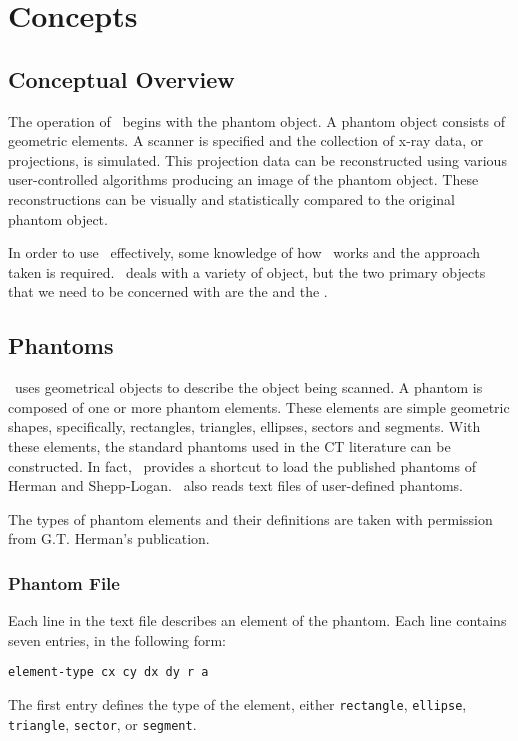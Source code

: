 \chapter{Concepts}
\ctsimfooter

\section{Conceptual Overview}
The operation of \ctsim\ begins with the phantom object.  A
phantom object consists of geometric elements.  A scanner is
specified and the collection of x-ray data, or projections, is
simulated. This projection data can be reconstructed using various
user-controlled algorithms producing an image of the phantom
object. These reconstructions can be visually and statistically
compared to the original phantom object.

In order to use \ctsim\ effectively, some knowledge of how
\ctsim\ works and the approach taken is required. \ctsim\ deals with a
variety of object, but the two primary objects that we need to be
concerned with are the  and the
.

\section{Phantoms}\label{conceptphantom}

\ctsim\ uses geometrical objects to describe the object being
scanned. A phantom is composed of one or more phantom elements.
These elements are simple geometric shapes, specifically,
rectangles, triangles, ellipses, sectors and segments. With these
elements, the standard phantoms used in the CT literature can be
constructed.  In fact, \ctsim\ provides a shortcut to load the
published phantoms of Herman\cite{HERMAN80} and
Shepp-Logan\cite{SHEPP74}. \ctsim\ also reads text files of
user-defined phantoms.

The types of phantom elements and their definitions are taken with
permission from G.T. Herman's publication\cite{HERMAN80}.

\subsection{Phantom File}\label{phantomfile}
Each line in the text file describes an element of the
phantom.  Each line contains seven entries, in the following form:
\begin{verbatim}
element-type cx cy dx dy r a
\end{verbatim}
The first entry defines the type of the element, either
\texttt{rectangle}, \texttt{ellipse}, \texttt{triangle},
\texttt{sector}, or \texttt{segment}.

